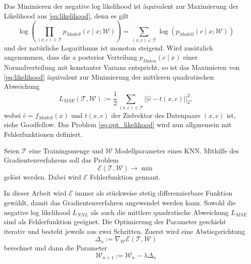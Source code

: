 Das Minimieren der negative log likelihood ist äquivalent zur Maximierung der Likelihood aus \ref{eq:likelihood}, denn es gilt 
\begin{equation*}
    \log \left(\prod_{(x,c) \in \mathcal{T}} p_{Modell}(c \; | \; x; \mathcal{W})\right)= \sum_{(x,c) \in \mathcal{T}} \log \left(p_{Modell}(c \; | \; x; \mathcal{W}) \right)
\end{equation*}
und der natürliche Logarithmus ist monoton steigend. Wird zusätzlich angenommen, dass die a posterior Verteilung  $p_{Daten}(c \; | \; x)$ einer Normalverteilung mit konstanter Varianz entspricht, so ist das Maximieren von \ref{eq:likelihood} äquivalent zur Minimierung der mittleren quadratischen Abweichung
\begin{equation*}
    \label{eq:MSE}
    L_{MSE}(\mathcal{T},\mathcal{W}):=\frac{1}{2} \sum_{(x,c) \in \mathcal{T}} ||\hat{c}-t(x,c)||_2^2,
\end{equation*}
wobei $\hat{c}=f_{Modell}(x)$ und $t(x,c)$ der Zielvektor des Datenpaars $(x,c)$ ist, siehe Goodfellow\cite{Goodfellow-et-al-2016}. 
Das Problem \ref{eq:opt_likelihood} wird nun allgmemein mit Fehlerfunktionen definiert.
 \begin{defi}[Fehlerfunktion]
    Seien $\mathcal{T}$ eine Trainingsmenge und $\mathcal{W}$ Modellparameter eines KNN. Mithilfe des Gradientenverfahrens soll das Problem
    \begin{equation}
        \label{eq:error_fun_opt}
        \mathcal{E}(\mathcal{T},\mathcal{W}) \rightarrow \min
    \end{equation}
    gelöst werden. Dabei wird $\mathcal{E}$ Fehlerfunktion gennant.
 \end{defi}
In dieser Arbeit wird $\mathcal{E}$ immer als stückweise stetig differenzierbare Funktion gewählt, damit das Gradientenverfahren angewendet werden kann. Sowohl die negative log likelihood $L_{NNL}$ als auch die mittlere quadratische Abweichung $L_{MSE}$ sind als Fehlerfunktion geeignet.
Die Optimierung der Parameter geschieht iterativ und besteht jeweils aus zwei Schritten. Zuerst wird eine Abstiegsrichtung 
\begin{equation}
    \label{eq:gradE}
    \Delta_n :=\nabla_{\mathcal{W}} \mathcal{E}(\mathcal{T},\mathcal{W})
\end{equation} 
berechnet und dann die Parameter 
\begin{equation}
    \label{eq:step}
    \mathcal{W}_{n+1}:=\mathcal{W}_n- \lambda \Delta_n
\end{equation}
